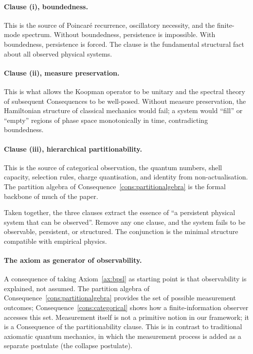 \documentclass[11pt,twocolumn,a4paper]{article}
\theoremstyle{axiomstyle}
\theoremstyle{conseqstyle}
\theoremstyle{definition}
\theoremstyle{remark}
\begin{document}
\paragraph{Clause (i), boundedness.} This is the source of Poincar\'e recurrence, oscillatory necessity, and the finite-mode spectrum. Without boundedness, persistence is impossible. With boundedness, persistence is forced. The clause is the fundamental structural fact about all observed physical systems.

\paragraph{Clause (ii), measure preservation.} This is what allows the Koopman operator to be unitary and the spectral theory of subsequent Consequences to be well-posed. Without measure preservation, the Hamiltonian structure of classical mechanics would fail; a system would ``fill'' or ``empty'' regions of phase space monotonically in time, contradicting boundedness.

\paragraph{Clause (iii), hierarchical partitionability.} This is the source of categorical observation, the quantum numbers, shell capacity, selection rules, charge quantisation, and identity from non-actualisation. The partition algebra of Consequence~\ref{cons:partitionalgebra} is the formal backbone of much of the paper.

Taken together, the three clauses extract the essence of ``a persistent physical system that can be observed''. Remove any one clause, and the system fails to be observable, persistent, or structured. The conjunction is the minimal structure compatible with empirical physics.

\paragraph{The axiom as generator of observability.} A consequence of taking Axiom~\ref{ax:bpsl} as starting point is that observability is explained, not assumed. The partition algebra of Consequence~\ref{cons:partitionalgebra} provides the set of possible measurement outcomes; Consequence~\ref{cons:categorical} shows how a finite-information observer accesses this set. Measurement itself is not a primitive notion in our framework; it is a Consequence of the partitionability clause. This is in contrast to traditional axiomatic quantum mechanics, in which the measurement process is added as a separate postulate (the collapse postulate).
\end{document}

